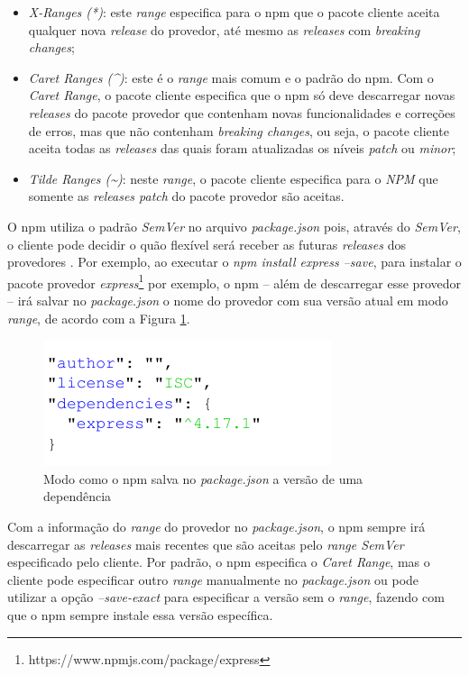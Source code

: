 \begin{itemize}
    \item \textit{X-Ranges (*)}: este \textit{range} especifica para o \gls{npm} que o pacote cliente aceita qualquer nova \textit{release} do provedor, até mesmo as \textit{releases} com \textit{breaking changes};
    \item \textit{Caret Ranges (\textasciicircum)}: este é o \textit{range} mais comum e o padrão do \gls{npm}. Com o \textit{Caret Range}, o pacote cliente especifica que o \gls{npm} só deve descarregar novas \textit{releases} do pacote provedor que contenham novas funcionalidades e correções de erros, mas que não contenham \textit{breaking changes}, ou seja, o pacote cliente aceita todas as \textit{releases} das quais foram atualizadas os níveis \textit{patch} ou \textit{minor};
    \item \textit{Tilde Ranges (\textasciitilde)}: neste \textit{range}, o pacote cliente especifica para o \textit{NPM} que somente as \textit{releases patch} do pacote provedor são aceitas.
\end{itemize}{}

O \gls{npm} utiliza o padrão \textit{SemVer} no arquivo \textit{package.json} pois, através do \textit{SemVer}, o cliente pode decidir o quão flexível será receber as futuras \textit{releases} dos provedores \cite{decan}. Por exemplo, ao executar o \textit{npm install express --save}, para instalar o pacote provedor \textit{express}\footnote{https://www.npmjs.com/package/express} por exemplo, o \gls{npm} -- além de descarregar esse provedor -- irá salvar no \textit{package.json} o nome do provedor com sua versão atual em modo \textit{range}, de acordo com a Figura \ref{fig:dep_express}.

\begin{figure}
    \centering
    \includegraphics[scale=1.3]{figuras/dependencies_express.pdf}
    \caption{Modo como o \gls{npm} salva no \textit{package.json} a versão de uma dependência}
    \label{fig:dep_express}
\end{figure}{}

Com a informação do \textit{range} do provedor no \textit{package.json}, o \gls{npm} sempre irá descarregar as \textit{releases} mais recentes que são aceitas pelo \textit{range SemVer} especificado pelo cliente. Por padrão, o \gls{npm} especifica o \textit{Caret Range}, mas o cliente pode especificar outro \textit{range} manualmente no \textit{package.json} ou pode utilizar a opção \textit{--save-exact} para especificar a versão sem o \textit{range}, fazendo com que o \gls{npm} sempre instale essa versão específica.

